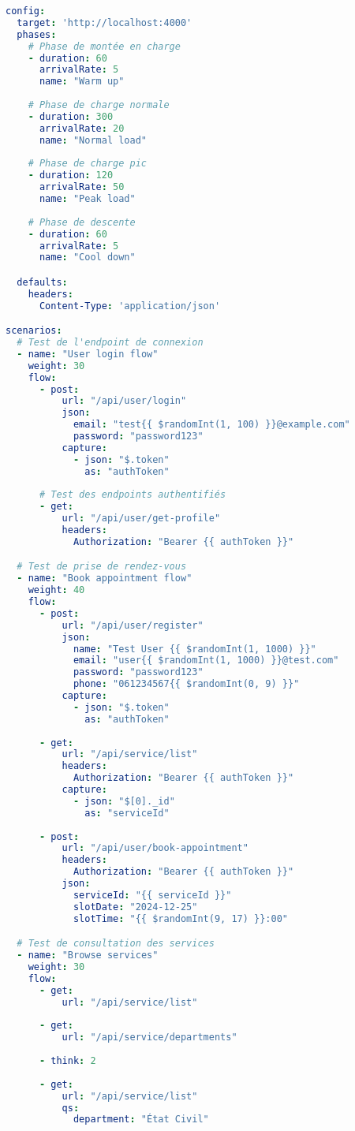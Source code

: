 \begin{lstlisting}[language=YAML, caption=artillery-config.yml]
config:
  target: 'http://localhost:4000'
  phases:
    # Phase de montée en charge
    - duration: 60
      arrivalRate: 5
      name: "Warm up"
    
    # Phase de charge normale
    - duration: 300
      arrivalRate: 20
      name: "Normal load"
    
    # Phase de charge pic
    - duration: 120
      arrivalRate: 50
      name: "Peak load"
    
    # Phase de descente
    - duration: 60
      arrivalRate: 5
      name: "Cool down"

  defaults:
    headers:
      Content-Type: 'application/json'

scenarios:
  # Test de l'endpoint de connexion
  - name: "User login flow"
    weight: 30
    flow:
      - post:
          url: "/api/user/login"
          json:
            email: "test{{ $randomInt(1, 100) }}@example.com"
            password: "password123"
          capture:
            - json: "$.token"
              as: "authToken"
      
      # Test des endpoints authentifiés
      - get:
          url: "/api/user/get-profile"
          headers:
            Authorization: "Bearer {{ authToken }}"

  # Test de prise de rendez-vous
  - name: "Book appointment flow"
    weight: 40
    flow:
      - post:
          url: "/api/user/register"
          json:
            name: "Test User {{ $randomInt(1, 1000) }}"
            email: "user{{ $randomInt(1, 1000) }}@test.com"
            password: "password123"
            phone: "061234567{{ $randomInt(0, 9) }}"
          capture:
            - json: "$.token"
              as: "authToken"
      
      - get:
          url: "/api/service/list"
          headers:
            Authorization: "Bearer {{ authToken }}"
          capture:
            - json: "$[0]._id"
              as: "serviceId"
      
      - post:
          url: "/api/user/book-appointment"
          headers:
            Authorization: "Bearer {{ authToken }}"
          json:
            serviceId: "{{ serviceId }}"
            slotDate: "2024-12-25"
            slotTime: "{{ $randomInt(9, 17) }}:00"

  # Test de consultation des services
  - name: "Browse services"
    weight: 30
    flow:
      - get:
          url: "/api/service/list"
      
      - get:
          url: "/api/service/departments"
          
      - think: 2
      
      - get:
          url: "/api/service/list"
          qs:
            department: "État Civil"
\end{lstlisting}

